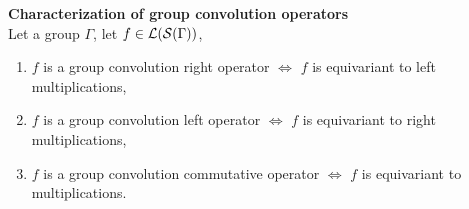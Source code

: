 \begin{theorem}\textbf{Characterization of group convolution operators}\\
Let a group $\Gamma$, let $f \in \mathcal{L}(\mathcal{S}(\Gamma))$,
\begin{enumerate}[nolistsep,noitemsep,label=(\roman*)]
  \item $f$ is a group convolution right operator $\Leftrightarrow$ $f$ is equivariant to left multiplications, \label{enum:p}
  \item $f$ is a group convolution left operator $\Leftrightarrow$ $f$ is equivariant to right multiplications, \label{enum:pp}
  \item $f$ is a group convolution commutative operator $\Leftrightarrow$ $f$ is equivariant to multiplications. \label{enum:ppp}%
\end{enumerate}
\label{th:cgco}
\end{theorem}
